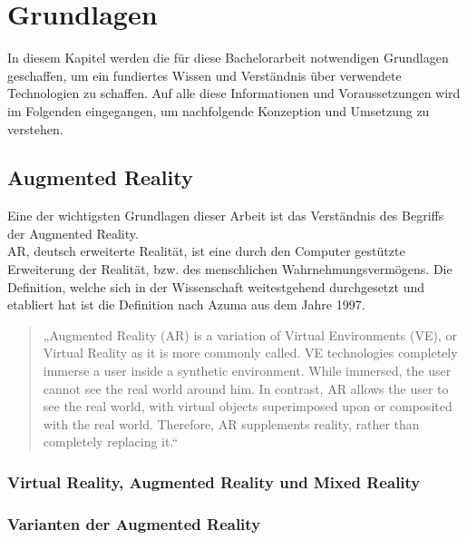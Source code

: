 
\chapter{Grundlagen}
\label{chap:Grundlagen}
In diesem Kapitel werden die für diese Bachelorarbeit notwendigen Grundlagen geschaffen, um ein fundiertes Wissen und Verständnis 
über verwendete Technologien zu schaffen. Auf alle diese Informationen und Voraussetzungen wird im Folgenden eingegangen, um nachfolgende 
Konzeption und Umsetzung zu verstehen.

\section{Augmented Reality}
\label{chap:Augmented Reality}
Eine der wichtigsten Grundlagen dieser Arbeit ist das Verständnis des Begriffs der Augmented Reality.
\\ 
\acl{AR}, deutsch erweiterte Realität, ist eine durch den Computer gestützte Erweiterung der Realität, bzw. des menschlichen 
Wahrnehmungsvermögens. Die Definition, welche sich in der Wissenschaft weitestgehend durchgesetzt und etabliert hat ist die Definition nach 
Azuma aus dem Jahre 1997.
\begin{quote}
    „Augmented Reality (AR) is a variation of Virtual Environments (VE), or Virtual Reality as it is more commonly called. VE 
    technologies completely immerse a user inside a synthetic environment. While immersed, the user cannot see the real world around him. 
    In contrast, AR allows the user to see the real world, with virtual objects superimposed upon or composited with the real world. Therefore, 
    AR supplements reality, rather than completely replacing it.“ \cite{azuma.1997a}
\end{quote}



\subsection{Virtual Reality, Augmented Reality und Mixed Reality}
\subsection{Varianten der Augmented Reality}
